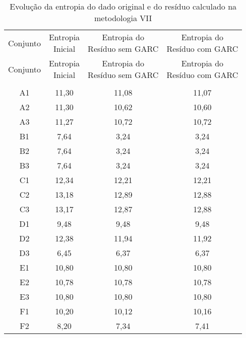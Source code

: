 \begin{center}
\begin{longtable}{cccc}
\toprule
\rowcolor{white}
\caption[Metodologia VII: evolução da entropia]{Evolução da entropia do dado
original e do resíduo calculado na metodologia VII}
\label{tab:EvolucaoEntropiaMet7}\\
\midrule
Conjunto & \specialcell{Entropia \\Inicial} & \specialcell{Entropia do
\\Resíduo sem GARC} & \specialcell{Entropia do
\\Resíduo com GARC}  \\
\midrule
\endfirsthead
\midrule
\rowcolor{white}
Conjunto & \specialcell{Entropia \\Inicial} & \specialcell{Entropia do
\\Resíduo sem GARC} & \specialcell{Entropia do
\\Resíduo com GARC}  \\
\toprule
\endhead
\midrule \\ %
\endfoot
\bottomrule 
\endlastfoot
    A1    & 11,30 & 11,08 & 11,07 \\
    A2    & 11,30 & 10,62 & 10,60 \\
    A3    & 11,27 & 10,72 & 10,72 \\
    B1    & 7,64  & 3,24  & 3,24 \\
    B2    & 7,64  & 3,24  & 3,24 \\
    B3    & 7,64  & 3,24  & 3,24 \\
    C1    & 12,34 & 12,21 & 12,21 \\
    C2    & 13,18 & 12,89 & 12,88 \\
    C3    & 13,17 & 12,87 & 12,88 \\
    D1    & 9,48  & 9,48  & 9,48 \\
    D2    & 12,38 & 11,94 & 11,92 \\
    D3    & 6,45  & 6,37  & 6,37 \\
    E1    & 10,80 & 10,80 & 10,80 \\
    E2    & 10,78 & 10,78 & 10,78 \\
    E3    & 10,80 & 10,80 & 10,80 \\
    F1    & 10,20 & 10,12 & 10,16 \\
    F2    & 8,20  & 7,34  & 7,41 \\

\end{longtable}
\end{center}
